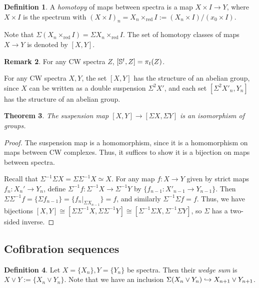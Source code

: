 \documentclass[11pt, titlepage]{article} %
\def\bb{\ensuremath\mathbb}
\def\inj{\ensuremath\hookrightarrow}
\numberwithin{equation}{subsection}
\theoremstyle{plain}
\newtheorem{theorem}{Theorem}[subsection]
\theoremstyle{definition}
\newtheorem{definition}[theorem]{Definition}
\newtheorem{remark}[theorem]{Remark}
\begin{document}
\begin{definition}
A \textit{homotopy} of maps between spectra is a map \(X\times I \to Y\), where \(X\times I\) is the spectrum with \((X\times I)_n=X_n\times_{\text{red}} I:= (X_n\times I)/(x_0\times I)\).
\end{definition}

Note that \(\Sigma(X_n\times_{\text{red}}I)=\Sigma X_n\times_{\text{red}}I\). The set of homotopy classes of maps \(X\to Y\) is denoted by \([X,Y]\). 

\begin{remark}
For any CW spectra \(Z\), \([\bb{S}^t, Z]=\pi_t(Z)\). %
\end{remark}

For any CW spectra \(X,Y\), the set \([X,Y]\) has the structure of an abelian group, since \(X\) can be written as a double suspension \(\Sigma^2X'\), and each set \([\Sigma^2X'_n, Y_n]\) has the structure of an abelian group. %

\begin{theorem}\label{2504151310}
The suspension map \([X,Y]\to [\Sigma X, \Sigma Y]\) is an isomorphism of groups.
\end{theorem}

\begin{proof}
The suspension map is a homomorphism, since it is a homomorphism on maps between CW complexes. Thus, it suffices to show it is a bijection on maps between spectra. 

Recall that \(\Sigma^{-1}\Sigma X=\Sigma\Sigma^{-1}X\simeq X\). For any map \(f : X \to Y\) given by strict maps \(f_n : X_n'\to Y_n\), define \(\Sigma^{-1}f : \Sigma^{-1}X \to \Sigma^{-1}Y\) by \(\{f_{n-1} : X'_{n-1}\to Y_{n-1}\}\). Then \(\Sigma\Sigma^{-1}f=\{\Sigma f_{n-1}\}=\{f_n|_{\Sigma X_{n-1}}\}=f\), and similarly \(\Sigma^{-1}\Sigma f =f\). Thus, we have bijections \([X,Y]\cong [\Sigma\Sigma^{-1}X, \Sigma\Sigma^{-1}Y]\cong [\Sigma^{-1}\Sigma X, \Sigma^{-1}\Sigma Y]\), so \(\Sigma\) has a two-sided inverse.
\end{proof}

\subsection{Cofibration sequences}\label{2503291211}

\begin{definition}
Let \(X=\{X_n\}, Y=\{Y_n\}\) be spectra. Then their \textit{wedge sum} is \(X\vee Y :=\{X_n \vee Y_n\}\). Note that %
we have an inclusion \(\Sigma(X_n\vee Y_n)\inj X_{n+1}\vee Y_{n+1}\). 
\end{definition}
\end{document}
